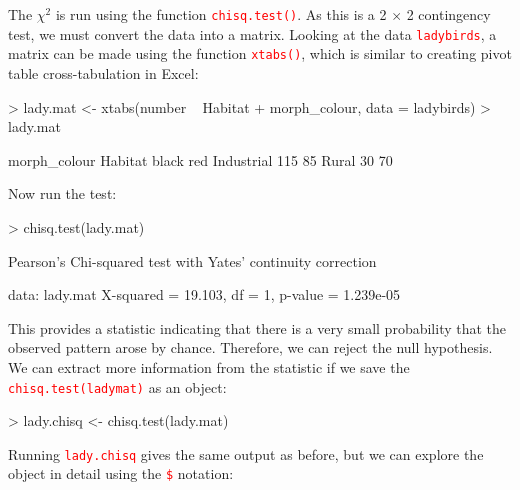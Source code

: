 \documentclass[a4paper,12pt]{article}
\newcommand\code[1]{\textcolor{red}{\texttt{#1}}}
\begin{document}
The $\chi^{2}$ is run using the function \code{chisq.test()}. As this is a 2 $\times$ 2 contingency test, we must convert the data into a matrix. Looking at the data \code{ladybirds}, a matrix can be made using the function \code{xtabs()}, which is similar to creating pivot table cross-tabulation in Excel:

\begin{shaded}
\begin{Schunk}
\begin{Sinput}
> lady.mat <- xtabs(number ~ Habitat + morph_colour, data = ladybirds)
> lady.mat
\end{Sinput}
\begin{Soutput}
            morph_colour
Habitat      black red
  Industrial   115  85
  Rural         30  70
\end{Soutput}
\end{Schunk}
\end{shaded}

Now run the test:

\begin{shaded}
\begin{Schunk}
\begin{Sinput}
> chisq.test(lady.mat)
\end{Sinput}
\begin{Soutput}
	Pearson's Chi-squared test with Yates' continuity correction

data:  lady.mat
X-squared = 19.103, df = 1, p-value = 1.239e-05
\end{Soutput}
\end{Schunk}
\end{shaded}


This provides a statistic indicating that there is a very small probability that the observed pattern arose by chance. Therefore, we can reject the null hypothesis. We can extract more information from the statistic if we save the \code{chisq.test(ladymat)} as an object:

\begin{shaded}
\begin{Schunk}
\begin{Sinput}
> lady.chisq <- chisq.test(lady.mat)
\end{Sinput}
\end{Schunk}
\end{shaded}

Running \code{lady.chisq} gives the same output as before, but we can explore the object in detail using the \code{\$} notation:
\end{document}
